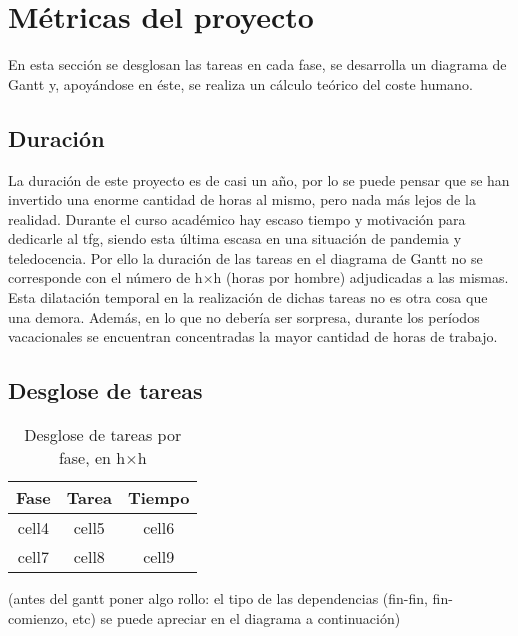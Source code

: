 \section{Métricas del proyecto}
En esta sección se desglosan las tareas en cada fase, se desarrolla un diagrama de Gantt y, apoyándose en éste, se realiza un cálculo teórico del coste humano.

\subsection{Duración}
La duración de este proyecto es de casi un año, por lo se puede pensar que se han invertido una enorme cantidad de horas al mismo, pero nada más lejos de la realidad. Durante el curso académico hay escaso tiempo y motivación para dedicarle al \acrshort{tfg}, siendo esta última escasa en una situación de pandemia y teledocencia. Por ello la duración de las tareas en el diagrama de Gantt no se corresponde con el número de h$\times$h (horas por hombre) adjudicadas a las mismas. Esta dilatación temporal en la realización de dichas tareas no es otra cosa que una demora. Además, en lo que no debería ser sorpresa, durante los períodos vacacionales se encuentran concentradas la mayor cantidad de horas de trabajo.

\subsection{Desglose de tareas}
\begin{table}[h!]
  \centering
  \begin{tabular}{ |c|c|c| }
  \hline
  \textbf{Fase} & \textbf{Tarea} & \textbf{Tiempo} \\ 
  \hline
  cell4 & cell5 & cell6 \\  
  cell7 & cell8 & cell9 \\
  \hline
  \end{tabular}
  \caption{Desglose de tareas por fase, en h$\times$h}
  \label{tab:desglose_de_tareas}
\end{table}




(antes del gantt poner algo rollo: el tipo de las dependencias (fin-fin, fin-comienzo, etc) se puede apreciar en el diagrama a continuación)